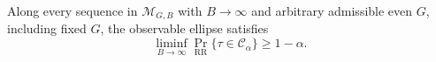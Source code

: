 Along every sequence in \(\mathcal M_{G,B}\) with \(B\to\infty\) and arbitrary admissible even \(G\), including fixed \(G\), the observable ellipse satisfies
\[
\liminf_{B\to\infty}\Pr_{\mathrm{RR}}\{\tau\in\mathcal C_\alpha\}\geq1-\alpha.
\]